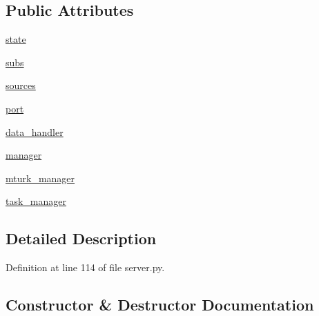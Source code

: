\subsection*{Public Attributes}
\begin{DoxyCompactItemize}
\item 
\hyperlink{classserver_1_1Application_a57fbb350ff0dc7289d430daf94ad0c23}{state}
\item 
\hyperlink{classserver_1_1Application_acb95f86301de18782a4757d4adc6184c}{subs}
\item 
\hyperlink{classserver_1_1Application_a9d456193276c9e26164922ba20a8dfb6}{sources}
\item 
\hyperlink{classserver_1_1Application_a46dd670e0b39f8b44bb1cf0a4114bf80}{port}
\item 
\hyperlink{classserver_1_1Application_ab97842caa30d7062d6c5efadf6cff0e7}{data\+\_\+handler}
\item 
\hyperlink{classserver_1_1Application_a7e875665524813ff1d8d524026396584}{manager}
\item 
\hyperlink{classserver_1_1Application_a8a8c20c18dd4229b39b43c7f7cccedcb}{mturk\+\_\+manager}
\item 
\hyperlink{classserver_1_1Application_a493229eae400f5ed7e51fc53d3426691}{task\+\_\+manager}
\end{DoxyCompactItemize}


\subsection{Detailed Description}


Definition at line 114 of file server.\+py.



\subsection{Constructor \& Destructor Documentation}
\mbox{\label{classserver_1_1Application_aa1e427d5314bf5ba10c5b45599a3bd02}} 
